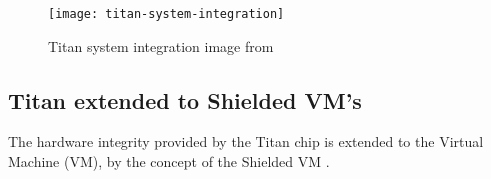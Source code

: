 \begin{figure}[!ht]
    \centering
    \texttt{[image: titan-system-integration]}
    \caption{Titan system integration image from \cite{yao_understanding_2021}}
    \label{fig:titan-system-integration}
\end{figure}


\subsection{Titan extended to Shielded VM’s}
The hardware integrity provided by the Titan chip is extended 
to the Virtual Machine (VM), by the concept of the Shielded VM 
\citep{leibl_gcp_2022}.


